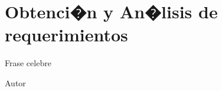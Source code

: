 %
%
%
%
%
%
%
%
%
%

\chapter{Obtenci�n y An�lisis de requerimientos}

\begin{FraseCelebre}
	\begin{Frase}
	Frase celebre
	
	\end{Frase}

	\begin{Fuente}
		Autor
	\end{Fuente}

\end{FraseCelebre}

